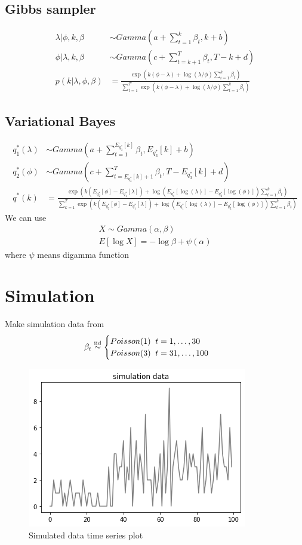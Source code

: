\documentclass[11pt]{article}
\begin{document}
	\subsection{Gibbs sampler}
	\begin{align*}
	\lambda | \phi,k,\beta &\sim Gamma(a + \sum_{t=1}^{k}\beta_t, k +b)\\
	\phi | \lambda,k,\beta &\sim Gamma(c + \sum_{t=k+1}^{T}\beta_t, T-k+d)\\
	p(k | \lambda,\phi,\beta) &= \frac{\exp(k(\phi- \lambda)+ \log(\lambda/\phi)\sum_{i=1}^{k}\beta_t)}{\sum_{t=1}^{T}\exp(k(\phi- \lambda)+ \log(\lambda/\phi)\sum_{t=1}^{k}\beta_t)}
	\end{align*}
	\subsection{Variational Bayes}
	\begin{align*}
	q_1^*(\lambda)  &\sim Gamma(a + \sum_{t=1}^{E_{q_3^*}[k]}\beta_t, E_{q_3^*}[k] +b)\\
	q_2^*(\phi) &\sim Gamma(c + \sum_{t=E_{q_3^*}[k]+1}^{T}\beta_t, T-E_{q_3^*}[k]+d)\\
	q^*(k) &= \frac{\exp(k(E_{q_2^*}[\phi]- E_{q_1^*}[\lambda])+ \log(E_{q_1^*}[\log(\lambda)]- E_{q_2^*}[\log(\phi)])\sum_{t=1}^{k}\beta_t)}{\sum_{k=1}^{T}\exp(k(E_{q_2^*}[\phi]- E_{q_1^*}[\lambda])+ \log(E_{q_1^*}[\log(\lambda)]- E_{q_2^*}[\log(\phi)])\sum_{t=1}^{k}\beta_t)}
	\end{align*}
	We can use
	\begin{align*}
	X \sim Gamma(\alpha,\beta)\\
	E[\log X] = -\log\beta +\psi(\alpha)
	\end{align*}
	where $\psi$ means digamma function
	
	\section{Simulation}
	Make simulation data from
	\begin{align*}
	\beta_t &\stackrel{\rm iid}{\sim} \begin{cases}
	Poisson(1)\;\; t= 1, \dots ,30 \\
	Poisson(3) \;\; t= 31, \dots ,100
	\end{cases}
	\end{align*}
	
	\begin{figure}[h]
		\centering
		\includegraphics[width=0.7\linewidth]{simuldata}
		\caption{Simulated data time series plot}
		\label{fig:simuldata}
	\end{figure}
\end{document}
